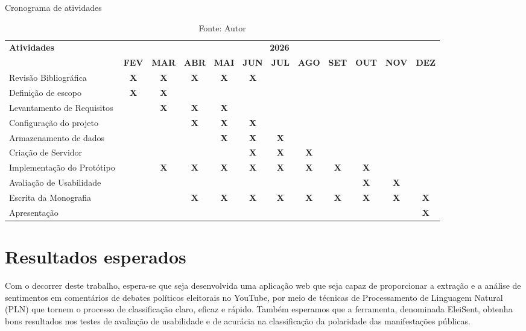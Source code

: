 \documentclass[
	12pt,				%
	openright,			%
	oneside,			%
	a4paper,			%
	english,			%
	brazil				%
	]{abntex2}
\begin{document}
\begin{table}[htp]
\centering
\caption{Cronograma de atividades}
\label{tab:cronograma}
\scriptsize
\setlength{\tabcolsep}{3.5pt} %
\begin{tabular}{|p{4.2cm}|c|c|c|c|c|c|c|c|c|c|c|}
\hline
\multirow{2}{*}{\textbf{Atividades}} & \multicolumn{11}{c|}{\textbf{2026}} \\ \cline{2-12} 
 & \textbf{FEV} & \textbf{MAR} & \textbf{ABR} & \textbf{MAI} & \textbf{JUN} & \textbf{JUL} & \textbf{AGO} & \textbf{SET} & \textbf{OUT} & \textbf{NOV} & \textbf{DEZ} \\ \hline
Revisão Bibliográfica & \textbf{X} & \textbf{X} & \textbf{X} & \textbf{X} & \textbf{X} & & & & & & \\ \hline
Definição de escopo & \textbf{X} & \textbf{X} & & & & & & & & & \\ \hline
Levantamento de Requisitos & & \textbf{X} & \textbf{X} & \textbf{X} & & & & & & & \\ \hline
Configuração do projeto & & & \textbf{X} & \textbf{X} & \textbf{X} & & & & & & \\ \hline
Armazenamento de dados & & & & \textbf{X} & \textbf{X} & \textbf{X} & & & & & \\ \hline
Criação de Servidor & & & & & \textbf{X} & \textbf{X} & \textbf{X} & & & & \\ \hline
Implementação do Protótipo & & \textbf{X} & \textbf{X} & \textbf{X} & \textbf{X} & \textbf{X} & \textbf{X} & \textbf{X} & \textbf{X} & & \\ \hline
Avaliação de Usabilidade & & & & & & & & & \textbf{X} & \textbf{X} & \\ \hline
Escrita da Monografia & & & \textbf{X} & \textbf{X} & \textbf{X} & \textbf{X} & \textbf{X} & \textbf{X} & \textbf{X} & \textbf{X} & \textbf{X} \\ \hline
Apresentação & & & & & & & & & & & \textbf{X} \\ \hline
\end{tabular}
\caption*{\footnotesize Fonte: Autor}
\end{table}

\chapter{Resultados esperados }
Com o decorrer deste trabalho, espera-se que seja desenvolvida uma aplicação web que seja capaz de proporcionar a extração e a análise de sentimentos em comentários de debates políticos eleitorais no YouTube, por meio de técnicas de Processamento de Linguagem Natural (PLN) que tornem o processo de classificação claro, eficaz e rápido. Também esperamos que a ferramenta, denominada EleiSent, obtenha bons resultados nos testes de avaliação de usabilidade e de acurácia na classificação da polaridade das manifestações públicas.
\end{document}
